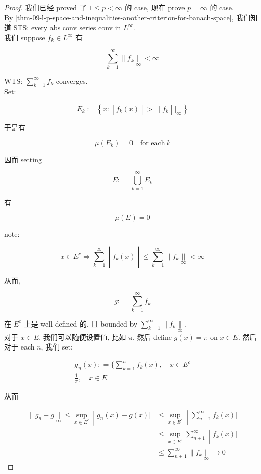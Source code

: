 \begin{proof}

我们已经 proved 了 \(1 \leq p < \infty\) 的 case, 现在 prove \(p = \infty\) 的 case.\\
By \ref{thm-09-l-p-space-and-inequalities-another-criterion-for-banach-space}, 我们知道 STS: every abs conv series conv in \(L^{\infty}\).\\
我们 suppose \(f_{k} \in L^{\infty}\) 有

\[\sum\limits_{k = 1}^{\infty} \parallel f_{k}\underset{\infty}{\parallel} < \infty\]

WTS: \(\sum_{k = 1}^{\infty}f_{k}\) converges.\\
Set:

\[E_{k} := \left\{ x: \middle| f_{k}(x) \middle| > \parallel f_{k} \middle| |_{\infty} \right\}\]

于是有

\[\mu(E_{k}) = 0\quad\text{for each}\ k\]

因而 setting

\[E: = \bigcup\limits_{k = 1}^{\infty}E_{k}\]

有

\[\mu(E) = 0\]

note:

\[\left. x \in E^{c}\Longrightarrow\sum\limits_{k = 1}^{\infty} \middle| f_{k}(x) \middle| \leq \sum\limits_{k = 1}^{\infty} \parallel f_{k}\underset{\infty}{\parallel} < \infty \right.\]

从而,

\[g: = \sum\limits_{k = 1}^{\infty}f_{k}\]

在 \(E^{c}\) 上是 well-defined 的, 且 bounded by \(\sum_{k = 1}^{\infty} \parallel f_{k}\underset{\infty}{\parallel}\).\\
对于 \(x \in E\), 我们可以随便设置值, 比如 \(\pi\), 然后 define \(g(x) = \pi\) on \(x \in E\). 然后对于 each \(n\), 我们 set:

\[\begin{matrix}
{g_{n}(x): = \{\sum\limits_{k = 1}^{n}f_{k}(x),\quad x \in E^{c}} \\
{\frac{1}{\pi},\quad x \in E}
\end{matrix}\]

从而

\[\begin{matrix}
\left. \parallel g_{n} - g\underset{\infty}{\parallel} \leq \sup\limits_{x \in E^{c}} \middle| g_{n}(x) - g(x)| \right. & \left. \leq \sup\limits_{x \in E^{c}} \middle| \sum\limits_{n + 1}^{\infty}f_{k}(x)| \right. \\
 & \left. \leq \sup\limits_{x \in E^{c}}\sum\limits_{n + 1}^{\infty} \middle| f_{k}(x)| \right. \\
 & {\leq \sum\limits_{n + 1}^{\infty} \parallel f_{k}\underset{\infty}{\parallel}\rightarrow 0}
\end{matrix}\]

\end{proof}


